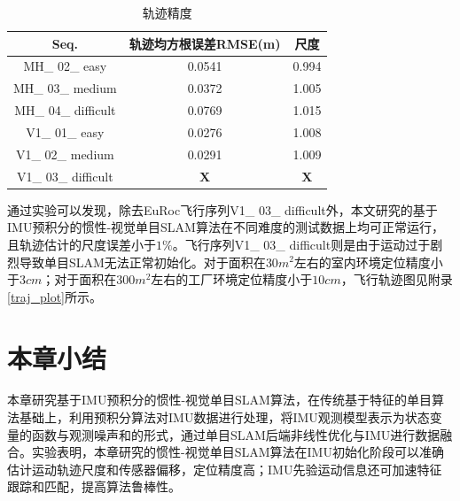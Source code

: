 \begin{table}[h]	%
\newcommand{\tabincell}[2]{\begin{tabular}{@{}#1@{}}#2\end{tabular}}		%
\renewcommand\arraystretch{1}		%
\centering
\caption{轨迹精度}   %
\label{tab5.1}
	\begin{tabular*}{0.9\textwidth}{@{\extracolsep{\fill}}ccc}  %
	\toprule
	Seq. &轨迹均方根误差RMSE(m) &尺度 \\
	\midrule
	MH\_ 02\_ easy 			&0.0541				&0.994				\\
	MH\_ 03\_ medium		&0.0372 			&1.005 				\\
	MH\_ 04\_ difficult		&0.0769				&1.015				\\
	V1\_ 01\_ easy 			&0.0276				&1.008 				\\
	V1\_ 02\_ medium		&0.0291				&1.009 				\\
	V1\_ 03\_ difficult		&$\boldsymbol{X}$	&$\boldsymbol{X}$	\\			
	\bottomrule
	\end{tabular*}
\end{table}

通过实验可以发现，除去EuRoc飞行序列V1\_ 03\_ difficult外，本文研究的基于IMU预积分的惯性-视觉单目SLAM算法在不同难度的测试数据上均可正常运行，且轨迹估计的尺度误差小于$1\%$。飞行序列V1\_ 03\_ difficult则是由于运动过于剧烈导致单目SLAM无法正常初始化。对于面积在$30 m^2$左右的室内环境定位精度小于$3cm$；对于面积在$300m^2$左右的工厂环境定位精度小于$10cm$，飞行轨迹图见附录\ref{traj_plot}所示。



\section{本章小结}
本章研究基于IMU预积分的惯性-视觉单目SLAM算法，在传统基于特征的单目算法基础上，利用预积分算法对IMU数据进行处理，将IMU观测模型表示为状态变量的函数与观测噪声和的形式，通过单目SLAM后端非线性优化与IMU进行数据融合。实验表明，本章研究的惯性-视觉单目SLAM算法在IMU初始化阶段可以准确估计运动轨迹尺度和传感器偏移，定位精度高；IMU先验运动信息还可加速特征跟踪和匹配，提高算法鲁棒性。




